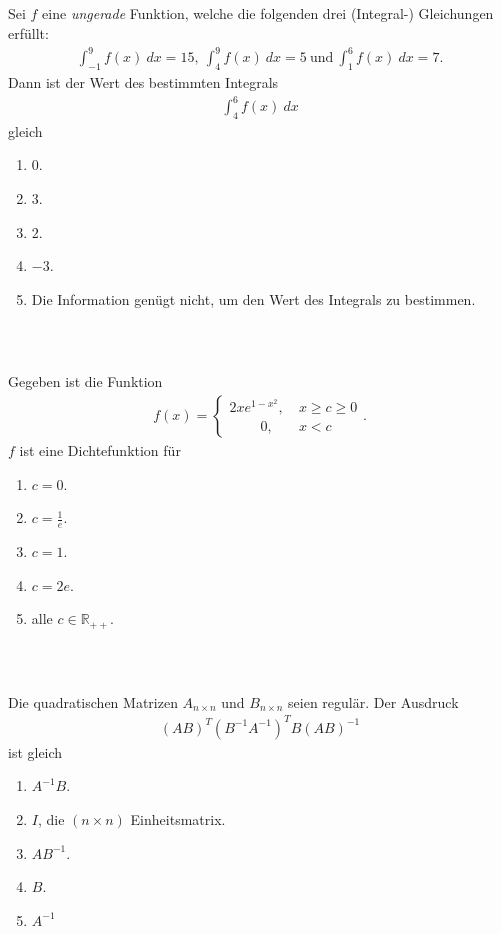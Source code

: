 \subsection*{}
Sei $ f $ eine \textit{ungerade} Funktion, welche die folgenden drei (Integral-) Gleichungen erfüllt:
\begin{align*}
	\int_{-1}^9 f(x) \ dx = 15, \
	\int_4^9 f(x) \ dx = 5 \ \textrm{und} \
	\int_1^6 f(x) \ dx = 7.
\end{align*}
Dann ist der Wert des bestimmten Integrals
\begin{align*}
	\int_4^6 f(x) \ dx
\end{align*}  
gleich
\renewcommand{\labelenumi}{(\alph{enumi})}
\begin{enumerate}
	\item 
	$ 0 $.
	\item
	$ 3 $.
	\item
	$ 2 $.
	\item
	$ -3 $.
	\item
	Die Information genügt nicht, um den Wert des Integrals zu bestimmen.
\end{enumerate}
\ \\
\subsection*{}
Gegeben ist die Funktion
\begin{align*}
f(x) =
\begin{cases}
	 2 x  e^{1 - x^2}, \ &x \geq c  \geq 0\\
 \qquad	\ 0 , \ &x < c
\end{cases}.
\end{align*}
$ f $ ist eine Dichtefunktion für
\renewcommand{\labelenumi}{(\alph{enumi})}
\begin{enumerate}
\item 
$ c = 0 $.
\item 
$ c = \frac{1}{e} $.
\item 
$ c= 1 $.
\item 
$ c = 2e $.
\item
alle $ c \in \mathbb{R}_{++} $.
\end{enumerate}
\ \\
\subsection*{}
Die quadratischen Matrizen $ A_{n \times n} $ und $ B_{n \times n} $ seien regulär.
Der Ausdruck
\begin{align*}
	(A B)^T(B^{-1} A^{-1})^T B (AB)^{-1}
\end{align*}
ist gleich
\renewcommand{\labelenumi}{(\alph{enumi})}
\begin{enumerate}
	\item 
	$ A^{-1} B $.
	\item 
	$ I $, die $ (n \times n) $ Einheitsmatrix.
	\item
	$ AB^{-1} $.
	\item
	$ B $.
	\item 
	$ A^{-1} $
\end{enumerate}
\ \\
